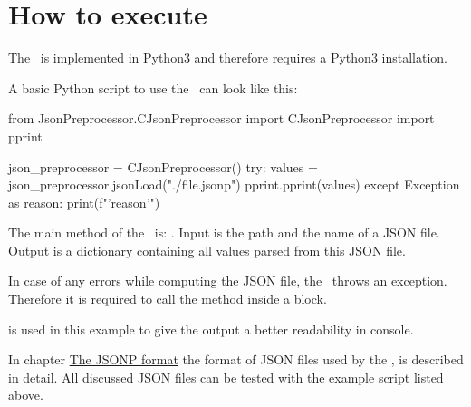 




\section{How to execute}

The \pkg\ is implemented in Python3 and therefore requires a Python3 installation.

A basic Python script to use the \pkg\ can look like this:

\begin{pythoncode}
from JsonPreprocessor.CJsonPreprocessor import CJsonPreprocessor
import pprint

json_preprocessor = CJsonPreprocessor()
try:
   values = json_preprocessor.jsonLoad("./file.jsonp")
   pprint.pprint(values)
except Exception as reason:
   print(f"'{reason}'")
\end{pythoncode}

The main method of the \pkg\ is: . Input is the path and the name of a JSON file.
Output is a dictionary containing all values parsed from this JSON file.

In case of any errors while computing the JSON file, the \pkg\ throws an exception. Therefore it is required
to call the method  inside a  block.

 is used in this example to give the output a better readability in console.

\vspace{2ex}

In chapter \hyperref[thejsonpformat]{The JSONP format} the format of JSON files used by the \pkg, is described in detail.
All discussed JSON files can be tested with the example script listed above.


